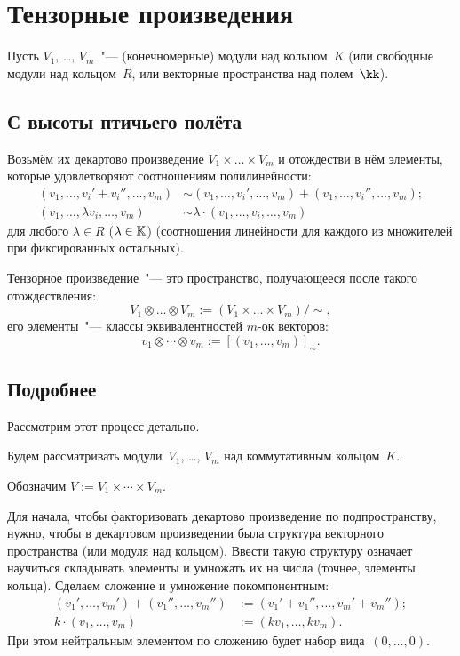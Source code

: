 \section{Тензорные произведения}


Пусть $V_1$, \dots, $V_m$~"--- (конечномерные) модули над кольцом~$K$ (или свободные модули над кольцом~$R$, или векторные пространства над полем~$\kk$).

\subsection{С высоты птичьего полёта}

Возьмём их декартово произведение $V_1 \times \dots \times V_m$ и отождестви в нём элементы, которые удовлетворяют соотношениям полилинейности:
\[
	\begin{aligned}
		(v_1, \dots, v_i' + v_i'', \dots, v_m)
		&\sim
		(v_1, \dots, v_i', \dots, v_m)
		+
		(v_1, \dots, v_i'', \dots, v_m)
		;
		\\
		(v_1, \dots, \lambda v_i, \dots, v_m)
		&\sim
		\lambda
		\cdot
		(v_1, \dots, v_i, \dots, v_m)
	\end{aligned}
\]
для любого $\lambda \in R$ ($\lambda \in \mathbb{K}$) (соотношения линейности для каждого из множителей при фиксированных остальных).

Тензорное произведение~"--- это пространство, получающееся после такого отождествления:
\[
	V_1 \otimes \dots \otimes V_m
	:=
	(V_1 \times \dots \times V_m)/\sim
	,
\]
его элементы~"--- классы эквивалентностей $m$-ок векторов:
\[
	v_1 \otimes \cdots \otimes v_m := [(v_1, \dots, v_m)]_{\sim}.
\]

\subsection{Подробнее}

Рассмотрим этот процесс детально.

Будем рассматривать модули~$V_1$, \dots, $V_m$ над коммутативным кольцом~$K$.

Обозначим $V := V_1 \times \cdots \times V_m$.

Для начала, чтобы факторизовать декартово произведение по подпространству, нужно, чтобы в декартовом произведении была структура векторного пространства (или модуля над кольцом).
Ввести такую структуру означает научиться складывать элементы и умножать их на числа (точнее, элементы кольца). Сделаем сложение и умножение покомпонентным:
\begin{align*}
	(v_1', \dots, v_m') +
	(v_1'', \dots, v_m'') &:=
	(v_1' + v_1'', \dots, v_m' + v_m'')
	;
	\\
	k \cdot (v_1, \dots, v_m) &:=
	(kv_1, \dots, kv_m)
	.
\end{align*}
При этом нейтральным элементом по сложению будет набор вида~$(0, \dots, 0)$.

